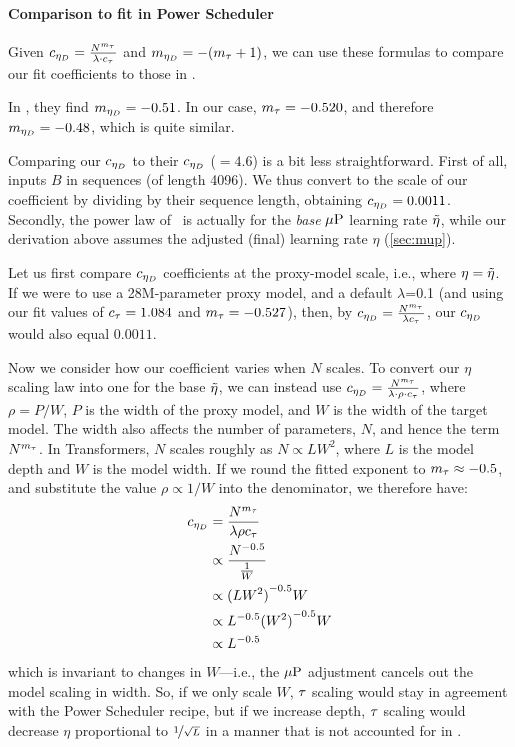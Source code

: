 \paragraph{Comparison to fit in Power Scheduler~\citep{shen2024power}}\label{sec:appendix_power_scheduler}

Given $c_{\eta_D} = \frac{N^{m_{\tau}}}{\lambda \cdot c_{\tau}}$ and $m_{\eta_D} =
-(m_{\tau} + 1)$, we can use these formulas to compare our fit
coefficients to those in \citet{shen2024power}.

In \citet{shen2024power}, they find $m_{\eta_D} = -0.51$.
%
In our case, $m_{\tau} = -0.520$, and therefore $m_{\eta_D} = -0.48$, which
is quite similar.

Comparing our $c_{\eta_D}$ to their $c_{\eta_D}$ ($= 4.6$) is a bit less
straightforward.  First of all, \citet{shen2024power} inputs $B$
in sequences (of length 4096).  We thus convert to the scale of our
coefficient by dividing by their sequence length, obtaining $c_{\eta_D} =
0.0011$.
%
Secondly, the power law of \citet{shen2024power}\ is actually for
the \emph{base} $\mbox{$\mu$P}$ learning rate $\tilde{\eta}$, while our derivation
above assumes the adjusted (final) learning rate $\eta$
(\cref{sec:mup}).

Let us first compare $c_{\eta_D}$ coefficients at the proxy-model scale,
i.e., where $\eta = \tilde{\eta}$.
%
If we were to use a 28M-parameter proxy model, and a default
$\lambda$=0.1 (and using our fit values of $c_{\tau}=1.084$ and
$m_{\tau}=-0.527$), then, by $c_{\eta_D} = \frac{N^{m_{\tau}}}{\lambda
  c_{\tau}}$, our $c_{\eta_D}$ would also equal $0.0011$.

Now we consider how our coefficient varies when $N$ scales.  To
convert our $\eta$ scaling law into one for the base $\tilde{\eta}$, we can
instead use $c_{\eta_D} = \frac{N^{m_{\tau}}}{\lambda \cdot \rho \cdot c_{\tau}}$, where $\rho = P/W$, $P$ is the width of the proxy model,
and $W$ is the width of the target model.
%
The width also affects the number of parameters, $N$, and hence the
term $N^{m_{\tau}}$.  In Transformers, $N$ scales roughly as $N
\propto L W^2$, where $L$ is the model depth and $W$ is the model
width.  If we round the fitted exponent to $m_{\tau} \approx -0.5$,
and substitute the value $\rho \propto 1/W$ into the denominator, we
therefore have:
\begin{align*}
  c_{\eta_D} &= \frac{N^{m_{\tau}}}{\lambda \rho c_{\tau}} \\
  &\propto \frac{N^{-0.5}}{\frac{1}{W}} \\
  &\propto {(L W^2)}^{-0.5}W \\
  &\propto {L}^{-0.5}{(W^2)}^{-0.5}W \\
  &\propto {L}^{-0.5}
\end{align*}
which is invariant to changes in $W$---i.e., the $\mbox{$\mu$P}$ adjustment
cancels out the model scaling in width.
%
So, if we only scale $W$, $\tau$ scaling would stay in agreement with
the Power Scheduler recipe, but if we increase depth, $\tau$ scaling
would decrease $\eta$ proportional to $\nicefrac{1}{\sqrt{L}}$ in a
manner that is not accounted for in \citet{shen2024power}.

